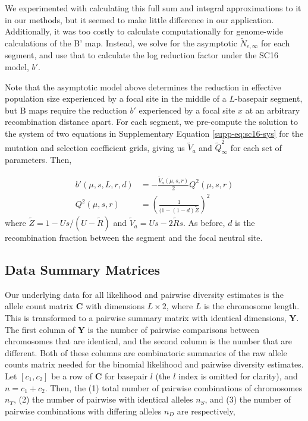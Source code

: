 \documentclass[11pt]{article}
\begin{document}
We experimented with calculating this full sum and integral approximations to
it in our methods, but it seemed to make little difference in our application.
Additionally, it was too costly to calculate computationally for genome-wide
calculations of the B' map. Instead, we solve for the asymptotic
$\widetilde{N}_{e,\infty}$ for each segment, and use that to calculate the log
reduction factor under the SC16 model, $b'$.

Note that the asymptotic model above determines the reduction in effective
population size experienced by a focal site in the middle of a $L$-basepair
segment, but B maps require the reduction $b'$ experienced by a focal site $x$
at an arbitrary recombination distance apart. For each segment, we pre-compute
the solution to the system of two equations in Supplementary Equation
\eqref{supp-eq:sc16-sys} for the mutation and selection coefficient grids,
giving us $\widetilde{V}_a$ and $\widetilde{Q}_\infty^2$ for each set of
parameters. Then, 

\begin{align} 
    b'(\mu, s, L, r, d) &= -\frac{\widetilde{V}_a(\mu, s, r)}{2} Q^2(\mu, s, r) \\
                        Q^2(\mu, s, r)&= \left(\frac{1}{(1-(1-d)\widetilde{Z}}\right)^2 
\end{align}
%
where $\widetilde{Z} = 1 - Us / (U-\widetilde{R})$ and $\widetilde{V}_a = Us - 2\widetilde{R}s$. As
before, $d$ is the recombination fraction between the segment and the focal
neutral site.

\subsection{Data Summary Matrices}
\label{supp:data-summary}

Our underlying data for all likelihood and pairwise diversity estimates is the
allele count matrix $\mathbf{C}$ with dimensions $L \times 2$, where $L$ is the
chromosome length. This is transformed to a pairwise summary matrix with
identical dimensions, $\mathbf{Y}$. The first column of $\mathbf{Y}$ is the
number of pairwise comparisons between chromosomes that are identical, and the
second column is the number that are different. Both of these columns are
combinatoric summaries of the raw allele counts matrix needed for the binomial
likelihood and pairwise diversity estimates. Let $[c_1, c_2]$ be a row of
$\mathbf{C}$ for basepair $l$ (the $l$ index is omitted for clarity), and $n =
c_1 + c_2$. Then, the (1) total number of pairwise combinations of chromosomes
$n_T$, (2) the number of pairwise with identical alleles $n_S$, and (3) the
number of pairwise combinations with differing alleles $n_D$ are respectively,
\end{document}
